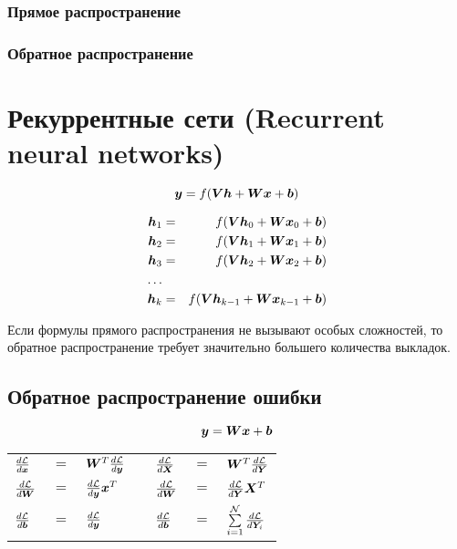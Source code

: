 \documentclass{report}
\numberwithin{theorem}{chapter}
\numberwithin{statement}{chapter}
\numberwithin{lemma}{chapter}
\theoremstyle{definition}
\numberwithin{task}{chapter}
\theoremstyle{remark}
\numberwithin{example}{chapter}
\theoremstyle{definition}
\numberwithin{definition}{chapter}
\theoremstyle{remark}
\theoremstyle{remark}
\numberwithin{lyrics}{section}
\begin{document}
\subsection{Прямое распространение}

\subsection{Обратное распространение}

\chapter{Рекуррентные сети (Recurrent neural networks)}


\begin{equation*}
\boldsymbol{y} = f(\boldsymbol{V} \boldsymbol{h} + \boldsymbol{W} \boldsymbol{x} + \boldsymbol{b})
\end{equation*}

\begin{eqnarray*}
\boldsymbol{h}_1 &= &f(\boldsymbol{V} \boldsymbol{h}_0 + \boldsymbol{W} \boldsymbol{x}_0 + \boldsymbol{b})\\
\boldsymbol{h}_2 &= &f(\boldsymbol{V} \boldsymbol{h}_1 + \boldsymbol{W} \boldsymbol{x}_1 + \boldsymbol{b})\\
\boldsymbol{h}_3 &= &f(\boldsymbol{V} \boldsymbol{h}_2 + \boldsymbol{W} \boldsymbol{x}_2 + \boldsymbol{b})\\
\dots \\
\boldsymbol{h}_k &= &f(\boldsymbol{V} \boldsymbol{h}_{k-1} + \boldsymbol{W} \boldsymbol{x}_{k-1} + \boldsymbol{b})\\
\end{eqnarray*}

Если формулы прямого распространения не вызывают особых сложностей, то обратное распространение требует значительно большего количества выкладок.

\section{Обратное распространение ошибки}

$$
\boldsymbol{y} = \boldsymbol{W} \boldsymbol{x} + \boldsymbol{b}
$$
\begin{table}
	\centering
	\begin{tabular}{lllclll}
		$\frac{d \mathcal{L}}{d \boldsymbol{x}}$ &$=$ &$\boldsymbol{W}^T \frac{d \mathcal{L}}{d \boldsymbol{y}}$ & & $\frac{d \mathcal{L}}{d \boldsymbol{X}}$ &$=$ &$\boldsymbol{W}^T \frac{d \mathcal{L}}{d \boldsymbol{Y}}$ \\
		$\frac{d \mathcal{L}}{d \boldsymbol{W}}$ &$=$ &$\frac{d \mathcal{L}}{d \boldsymbol{y}} \boldsymbol{x}^T$ & & $\frac{d \mathcal{L}}{d \boldsymbol{W}}$ &$=$ &$\frac{d \mathcal{L}}{d \boldsymbol{Y}} \boldsymbol{X}^T$ \\
		$\frac{d \mathcal{L}}{d \boldsymbol{b}}$ &$=$ &$\frac{d \mathcal{L}}{d \boldsymbol{y}}$          & & $\frac{d \mathcal{L}}{d \boldsymbol{b}}$ &$=$ &$\sum\limits_{i=1}^{\mathcal{N}}\frac{d \mathcal{L}}{d \boldsymbol{Y}_i}$
	\end{tabular}
\end{table}
\end{document}
